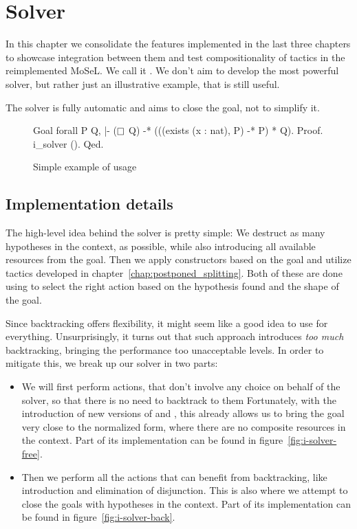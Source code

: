 \chapter{Solver}
\label{chap:solver}

In this chapter we consolidate the features implemented in the last three chapters to showcase integration between them and test compositionality of tactics in the reimplemented MoSeL.
We call it .
We don't aim to develop the most powerful solver, but rather just an illustrative example, that is still useful.

The solver is fully automatic and aims to close the goal, not to simplify it.

\begin{figure}[H]
\begin{coq}
Goal forall P Q, |- ($\mathop{\Box}$ Q) -* (((exists (x : nat), P) -* P) * Q).
Proof. i_solver (). Qed.
\end{coq}
  \caption{Simple example of  usage}
  \label{fig:i-solver-init-example}
\end{figure}

\section{Implementation details}
\label{sec:i-solver-implementation-idea}

The high-level idea behind the solver is pretty simple:
We destruct as many hypotheses in the context, as possible, while also introducing all available resources from the goal.
Then we apply constructors based on the goal and utilize tactics developed in chapter~\ref{chap:postponed_splitting}.
Both of these are done using  to select the right action based on the hypothesis found and the shape of the goal.

Since backtracking offers flexibility, it might seem like a good idea to use  for everything.
Unsurprisingly, it turns out that such approach introduces \emph{too much} backtracking, bringing the performance too unacceptable levels.
In order to mitigate this, we break up our solver in two parts:
\begin{itemize}
\item We will first perform actions, that don't involve any choice on behalf of the solver, so that there is no need to backtrack to them
  Fortunately, with the introduction of new versions of  and , this already allows us to bring the goal very close to the normalized form, where there are no composite resources in the context.
  Part of its implementation can be found in figure~\ref{fig:i-solver-free}.
\item Then we perform all the actions that can benefit from backtracking, like introduction and elimination of disjunction.
  This is also where we attempt to close the goals with hypotheses in the context.
  Part of its implementation can be found in figure~\ref{fig:i-solver-back}.
\end{itemize}

